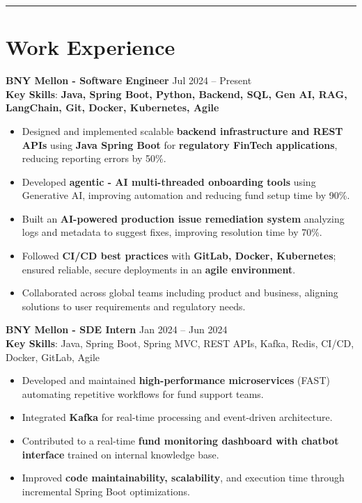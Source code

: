 \documentclass[a4paper,10.8pt]{article}
\begin{document}
\hrule
\vspace{3pt}

\section*{Work Experience}

\textbf{BNY Mellon - Software Engineer} \hfill Jul 2024 -- Present\\
\textbf{Key Skills}: \textbf{Java, Spring Boot, Python, Backend, SQL, Gen AI, RAG, LangChain, Git, Docker, Kubernetes, Agile}
\begin{itemize}
    \item Designed and implemented scalable \textbf{backend infrastructure and REST APIs} using \textbf{Java Spring Boot} for \textbf{regulatory FinTech applications}, reducing reporting errors by 50\%.
    \item Developed \textbf{agentic - AI multi-threaded onboarding tools} using Generative AI, improving automation and reducing fund setup time by 90\%.
    \item Built an \textbf{AI-powered} \textbf{production issue remediation system} analyzing logs and metadata to suggest fixes, improving resolution time by 70\%.
    \item Followed \textbf{CI/CD best practices} with \textbf{GitLab, Docker, Kubernetes}; ensured reliable, secure deployments in an \textbf{agile environment}.
    \item Collaborated across global teams including product and business, aligning solutions to user requirements and regulatory needs.
\end{itemize}
\vspace{3 pt}
\textbf{BNY Mellon - SDE Intern} \hfill Jan 2024 -- Jun 2024\\
\textbf{Key Skills}: Java, Spring Boot, Spring MVC, REST APIs, Kafka, Redis, CI/CD, Docker, GitLab, Agile
\begin{itemize}
    \item Developed and maintained \textbf{high-performance microservices} (FAST) automating repetitive workflows for fund support teams.
    \item Integrated \textbf{Kafka} for real-time processing and event-driven architecture.
    \item Contributed to a real-time \textbf{fund monitoring dashboard with chatbot interface} trained on internal knowledge base.
    \item Improved \textbf{code maintainability, scalability}, and execution time through incremental Spring Boot optimizations.
\end{itemize}
\end{document}
